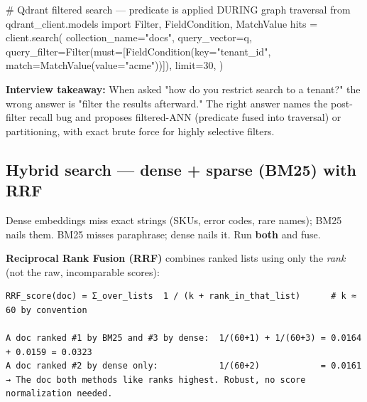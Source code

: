 \documentclass[11pt]{article}
\newenvironment{Shaded}{\begin{snugshade}}{\end{snugshade}}
\newcommand{\CommentTok}[1]{\textcolor[rgb]{0.48,0.49,0.49}{#1}}
\newcommand{\DecValTok}[1]{\textcolor[rgb]{0.96,0.45,0.00}{#1}}
\newcommand{\ImportTok}[1]{\textcolor[rgb]{0.15,0.68,0.38}{#1}}
\newcommand{\NormalTok}[1]{\textcolor[rgb]{0.81,0.81,0.76}{#1}}
\newcommand{\OperatorTok}[1]{\textcolor[rgb]{0.81,0.81,0.76}{#1}}
\newcommand{\StringTok}[1]{\textcolor[rgb]{0.96,0.31,0.31}{#1}}
\begin{document}

\begin{Shaded}
\begin{Highlighting}[]
\CommentTok{\# Qdrant filtered search — predicate is applied DURING graph traversal}
\ImportTok{from}\NormalTok{ qdrant\_client.models }\ImportTok{import}\NormalTok{ Filter, FieldCondition, MatchValue}
\NormalTok{hits }\OperatorTok{=}\NormalTok{ client.search(}
\NormalTok{    collection\_name}\OperatorTok{=}\StringTok{"docs"}\NormalTok{,}
\NormalTok{    query\_vector}\OperatorTok{=}\NormalTok{q,}
\NormalTok{    query\_filter}\OperatorTok{=}\NormalTok{Filter(must}\OperatorTok{=}\NormalTok{[FieldCondition(key}\OperatorTok{=}\StringTok{"tenant\_id"}\NormalTok{, match}\OperatorTok{=}\NormalTok{MatchValue(value}\OperatorTok{=}\StringTok{"acme"}\NormalTok{))]),}
\NormalTok{    limit}\OperatorTok{=}\DecValTok{30}\NormalTok{,}
\NormalTok{)}
\end{Highlighting}
\end{Shaded}

\textbf{Interview takeaway:} When asked "how do you restrict search to a tenant?" the wrong answer is "filter the results afterward." The right answer names the post-filter recall bug and proposes filtered-ANN (predicate fused into traversal) or partitioning, with exact brute force for highly selective filters.

\subsection{Hybrid search --- dense + sparse (BM25) with RRF}\label{hybrid-search--dense--sparse-bm25-with-rrf}

Dense embeddings miss exact strings (SKUs, error codes, rare names); BM25 nails them. BM25 misses paraphrase; dense nails it. Run \textbf{both} and fuse.

\textbf{Reciprocal Rank Fusion (RRF)} combines ranked lists using only the \emph{rank} (not the raw, incomparable scores):

\setcodelang{}

\begin{verbatim}
RRF_score(doc) = Σ_over_lists  1 / (k + rank_in_that_list)      # k ≈ 60 by convention

A doc ranked #1 by BM25 and #3 by dense:  1/(60+1) + 1/(60+3) = 0.0164 + 0.0159 = 0.0323
A doc ranked #2 by dense only:            1/(60+2)            = 0.0161
→ The doc both methods like ranks highest. Robust, no score normalization needed.
\end{verbatim}
\end{document}
